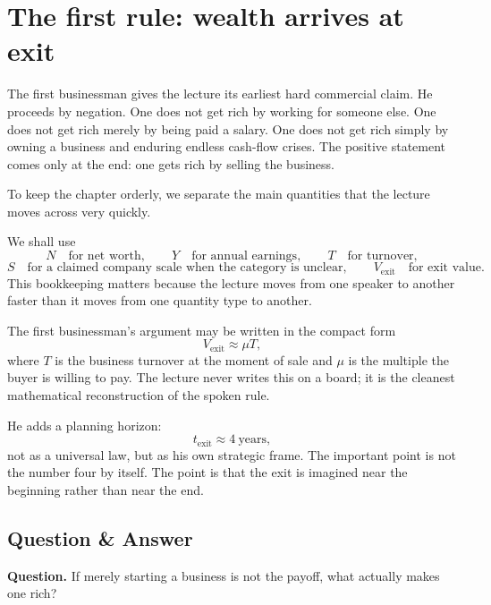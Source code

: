 \section{The first rule: wealth arrives at exit}

The first businessman gives the lecture its earliest hard commercial claim. He proceeds by negation. One does not get rich by working for someone else. One does not get rich merely by being paid a salary. One does not get rich simply by owning a business and enduring endless cash-flow crises. The positive statement comes only at the end: one gets rich by selling the business.

To keep the chapter orderly, we separate the main quantities that the lecture moves across very quickly.

\begin{definition}
We shall use
\[
N \quad \text{for net worth}, \qquad
Y \quad \text{for annual earnings}, \qquad
T \quad \text{for turnover},
\]
\[
S \quad \text{for a claimed company scale when the category is unclear}, \qquad
V_{\mathrm{exit}} \quad \text{for exit value}.
\]
This bookkeeping matters because the lecture moves from one speaker to another faster than it moves from one quantity type to another.
\end{definition}

The first businessman's argument may be written in the compact form
\begin{equation}
V_{\mathrm{exit}} \approx \mu T,
\end{equation}
where \(T\) is the business turnover at the moment of sale and \(\mu\) is the multiple the buyer is willing to pay. The lecture never writes this on a board; it is the cleanest mathematical reconstruction of the spoken rule.

He adds a planning horizon:
\begin{equation}
t_{\mathrm{exit}} \approx 4\ \text{years},
\end{equation}
not as a universal law, but as his own strategic frame. The important point is not the number four by itself. The point is that the exit is imagined near the beginning rather than near the end.

\subsection{Question \& Answer}

\textbf{Question.} If merely starting a business is not the payoff, what actually makes one rich?


